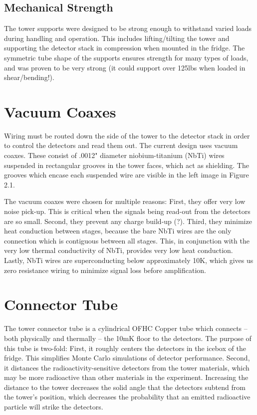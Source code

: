 \documentclass{report}
\begin{document}
\subsection{Mechanical Strength}
The tower supports were designed to be strong enough to withstand varied loads during handling and operation. This includes lifting/tilting the tower and supporting the detector stack in compression when mounted in the fridge. The symmetric tube shape of the supports ensures strength for many types of loads, and was proven to be very strong (it could support over 125lbs when loaded in shear/bending!).


\section{Vacuum Coaxes}
Wiring must be routed down the side of the tower to the detector stack in order to control the detectors and read them out. The current design uses vacuum coaxes. These consist of .0012" diameter niobium-titanium (NbTi) wires suspended in rectangular grooves in the tower faces, which act as shielding. The grooves which encase each suspended wire are visible in the left image in Figure 2.1.

The vacuum coaxes were chosen for multiple reasons: First, they offer very low noise pick-up. This is critical when the signals being read-out from the detectors are so small. Second, they prevent any charge build-up (?). Third, they minimize heat conduction between stages, because the bare NbTi wires are the only connection which is contiguous between all stages. This, in conjunction with the very low thermal conductivity of NbTi, provides very low heat conduction. Lastly, NbTi wires are superconducting below approximately 10K, which gives us zero resistance wiring to minimize signal loss before amplification.

\section{Connector Tube}
The tower connector tube is a cylindrical OFHC Copper tube which connects -- both physically and thermally -- the 10mK floor to the detectors. The purpose of this tube is two-fold: First, it roughly centers the detectors in the icebox of the fridge. This simplifies Monte Carlo simulations of detector performance. Second, it distances the radioactivity-sensitive detectors from the tower materials, which may be more radioactive than other materials in the experiment. Increasing the distance to the tower decreases the solid angle that the detectors subtend from the tower's position, which decreases the probability that an emitted radioactive particle will strike the detectors.
\end{document}
